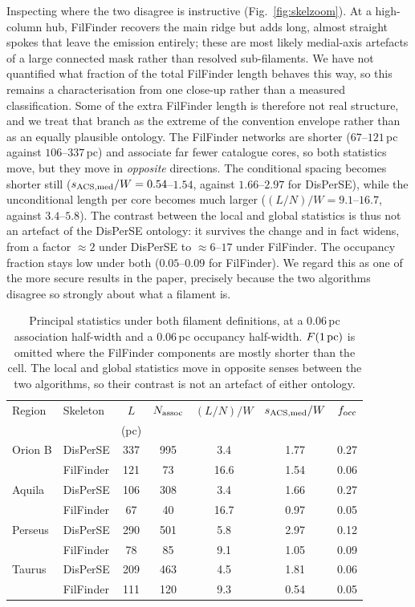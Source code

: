 \documentclass[usenatbib,twoside,twocolumn]{mnras}
\begin{document}
Inspecting where the two disagree is instructive (Fig.~\ref{fig:skelzoom}). At a high-column hub, FilFinder recovers the main ridge but adds long, almost straight spokes that leave the emission entirely; these are most likely medial-axis artefacts of a large connected mask rather than resolved sub-filaments. We have not quantified what fraction of the total FilFinder length behaves this way, so this remains a characterisation from one close-up rather than a measured classification. Some of the extra FilFinder length is therefore not real structure, and we treat that branch as the extreme of the convention envelope rather than as an equally plausible ontology. The FilFinder networks are shorter ($67$--$121$\,pc against $106$--$337$\,pc) and associate far fewer catalogue cores, so both statistics move, but they move in \emph{opposite} directions. The conditional spacing becomes shorter still ($s_{\rm ACS,med}/W=0.54$--$1.54$, against $1.66$--$2.97$ for DisPerSE), while the unconditional length per core becomes much larger ($(L/N)/W=9.1$--$16.7$, against $3.4$--$5.8$). The contrast between the local and global statistics is thus not an artefact of the DisPerSE ontology: it survives the change and in fact widens, from a factor $\approx2$ under DisPerSE to $\approx6$--$17$ under FilFinder. The occupancy fraction stays low under both ($0.05$--$0.09$ for FilFinder). We regard this as one of the more secure results in the paper, precisely because the two algorithms disagree so strongly about what a filament is.

\begin{table}
\caption{Principal statistics under both filament definitions, at a $0.06$\,pc association half-width and a $0.06$\,pc occupancy half-width. $F(1\,{\rm pc})$ is omitted where the FilFinder components are mostly shorter than the cell. The local and global statistics move in opposite senses between the two algorithms, so their contrast is not an artefact of either ontology.}
\label{tab:ontology}
\footnotesize
\setlength{\tabcolsep}{3pt}
\begin{tabular}{llccccc}
\toprule
Region & Skeleton & $L$ & $N_{\rm assoc}$ & $(L/N)/W$ & $s_{\rm ACS,med}/W$ & $f_{\rm occ}$ \\
 & & (pc) & & & & \\
\midrule
Orion B & DisPerSE  & 337 & 995 & 3.4 & 1.77 & 0.27 \\
        & FilFinder & 121 &  73 & 16.6 & 1.54 & 0.06 \\
Aquila  & DisPerSE  & 106 & 308 & 3.4 & 1.66 & 0.27 \\
        & FilFinder &  67 &  40 & 16.7 & 0.97 & 0.05 \\
Perseus & DisPerSE  & 290 & 501 & 5.8 & 2.97 & 0.12 \\
        & FilFinder &  78 &  85 &  9.1 & 1.05 & 0.09 \\
Taurus  & DisPerSE  & 209 & 463 & 4.5 & 1.81 & 0.06 \\
        & FilFinder & 111 & 120 &  9.3 & 0.54 & 0.05 \\
\bottomrule
\end{tabular}
\end{table}
\end{document}
